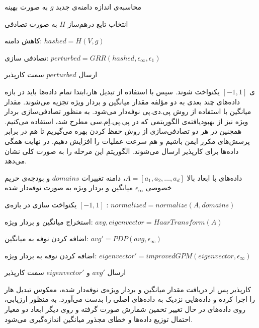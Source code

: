  محاسبه‌ی اندازه دامنه‌ی جدید $g$ به صورت بهینه

 انتخاب تابع درهم‌ساز $H$ به صورت تصادفی

 کاهش دامنه: $hashed = H(V, g)$

 تصادفی سازی: $perturbed = GRR(hashed, \epsilon_\infty, \epsilon_1)$

 ارسال $perturbed$ سمت کارپذیر



ابتدا تمام داده‌ها باید در بازه‌‎ی $[-1, 1]$ یکنواخت شوند. سپس با استفاده از تبدیل هار، داده‌های چند بعدی به دو مؤلفه مقدار میانگین و بردار ویژه تجزیه می‌شوند. مقدار میانگین با استفاده از روش پی.دی.پی نوفه‌دار می‌شود. به منظور تصادفی‌سازی بردار ویژه نیز از بهبودیافته‌ی الگوریتمی که در پی.پی.اِم.سی مطرح شد، استفاده ‌می‌کنیم. همچنین در هر دو تصادفی‌سازی از روش حفظ کردن بهره می‌گیریم تا هم در برابر پرسش‌های مکرر ایمن باشیم و هم سرعت عملیات را افزایش دهیم. در نهایت همگی داده‌ها برای کارپذیر ارسال می‌شوند. الگوریتم  این مرحله را به صورت کلی نشان می‌دهد.

 داده‌های با ابعاد بالا $A = [a_1, a_2, \ldots, a_d]$، دامنه تغییرات $domains$ و بودجه‌ی حریم خصوصی $\epsilon_\infty$
 میانگین و بردار ویژه به صورت نوفه‌دار شده

 یکنواخت سازی در بازه‌ی $[-1, 1]$ : $normalized = normalize(A, domains)$

 استخراج میانگین و بردار ویژه: $avg, eigenvector = HaarTransform(A)$

 اضافه کردن نوفه به میانگین: $avg' = PDP(avg, \epsilon_\infty)$

 اضافه کردن نوفه به بردار ویژه: $eigenvector' = improvedGPM(eigenvector, \epsilon_\infty)$

 ارسال $avg'$ و $eigenvector'$ سمت کارپذیر



کارپذیر پس از دریافت مقدار میانگین و بردار ویژه‌ی نوفه‌‌دار شده، معکوس تبدیل هار را اجرا کرده و داده‌هایی نزدیک به داده‌های اصلی را بدست می‌آورد. به منظور ارزیابی، روی داده‌های در حال تغییر تخمین شمارش صورت گرفته و روی دیگر ابعاد دو معیار احتمال توزیع داده‌ها و خطای مجذور میانگین اندازه‌گیری می‌شود.

